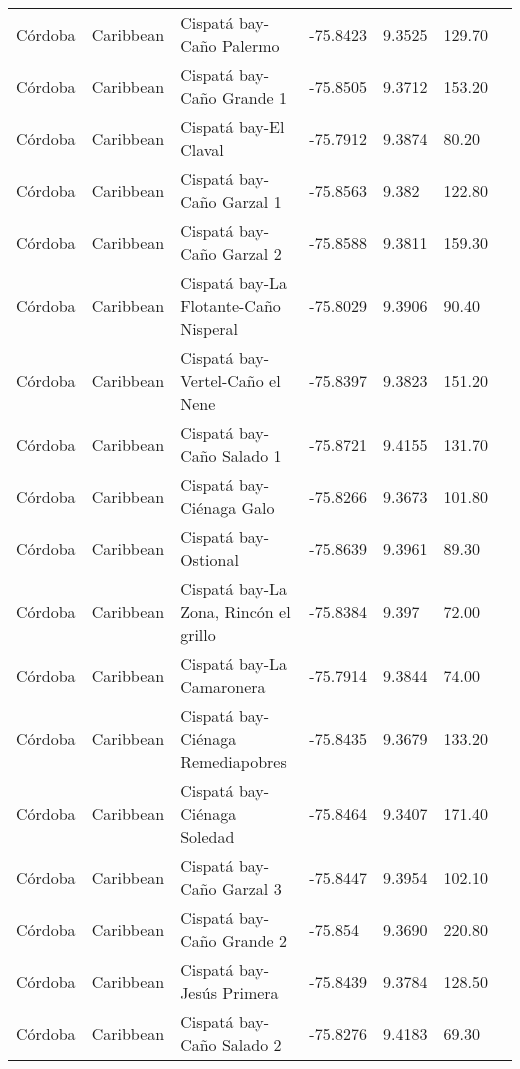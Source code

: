 \documentclass[review, authoryear]{elsarticle}   	%
\begin{document}
\begin{table}[htbp]
\begin{tabular}{p{2.0cm}p{2.0cm}p{4.0cm}p{1.0cm}p{1.0cm}p{2.0cm}p{2.5cm}}
C\'{o}rdoba&Caribbean&Cispat\'{a} bay-Ca\~{n}o Palermo&-75.8423&9.3525&129.70&\citet{Bolivar_inpreparation}\\ 
C\'{o}rdoba&Caribbean&Cispat\'{a} bay-Ca\~{n}o Grande 1&-75.8505&9.3712&153.20&\citet{Bolivar_inpreparation}\\ 
C\'{o}rdoba&Caribbean&Cispat\'{a} bay-El Claval&-75.7912&9.3874&80.20&\citet{Bolivar_inpreparation}\\ 
C\'{o}rdoba&Caribbean&Cispat\'{a} bay-Ca\~{n}o  Garzal 1&-75.8563&9.382&122.80&\citet{Bolivar_inpreparation}\\ 
C\'{o}rdoba&Caribbean&Cispat\'{a} bay-Ca\~{n}o  Garzal 2&-75.8588&9.3811&159.30&\citet{Bolivar_inpreparation}\\ 
C\'{o}rdoba&Caribbean&Cispat\'{a} bay-La Flotante-Ca\~{n}o Nisperal&-75.8029&9.3906&90.40&\citet{Bolivar_inpreparation}\\ 
C\'{o}rdoba&Caribbean&Cispat\'{a} bay-Vertel-Ca\~{n}o el Nene&-75.8397&9.3823&151.20&\citet{Bolivar_inpreparation}\\ 
C\'{o}rdoba&Caribbean&Cispat\'{a} bay-Ca\~{n}o Salado 1&-75.8721&9.4155&131.70&\citet{Bolivar_inpreparation}\\ 
C\'{o}rdoba&Caribbean&Cispat\'{a} bay-Ci\'{e}naga Galo&-75.8266&9.3673&101.80&\citet{Bolivar_inpreparation}\\ 
C\'{o}rdoba&Caribbean&Cispat\'{a} bay-Ostional&-75.8639&9.3961&89.30&\citet{Bolivar_inpreparation}\\ 
C\'{o}rdoba&Caribbean&Cispat\'{a} bay-La Zona, Rinc\'{o}n el grillo&-75.8384&9.397&72.00&\citet{Bolivar_inpreparation}\\ 
C\'{o}rdoba&Caribbean&Cispat\'{a} bay-La Camaronera&-75.7914&9.3844&74.00&\citet{Bolivar_inpreparation}\\ 
C\'{o}rdoba&Caribbean&Cispat\'{a} bay-Ci\'{e}naga Remediapobres&-75.8435&9.3679&133.20&\citet{Bolivar_inpreparation}\\ 
C\'{o}rdoba&Caribbean&Cispat\'{a}  bay-Ci\'{e}naga Soledad&-75.8464&9.3407&171.40&\citet{Bolivar_inpreparation}\\ 
C\'{o}rdoba&Caribbean&Cispat\'{a} bay-Ca\~{n}o Garzal 3&-75.8447&9.3954&102.10&\citet{Bolivar_inpreparation}\\ 
C\'{o}rdoba&Caribbean&Cispat\'{a} bay-Ca\~{n}o Grande 2&-75.854&9.3690&220.80&\citet{Bolivar_inpreparation}\\ 
C\'{o}rdoba&Caribbean&Cispat\'{a} bay-Jes\'{u}s Primera&-75.8439&9.3784&128.50&\citet{Bolivar_inpreparation}\\ 
C\'{o}rdoba&Caribbean&Cispat\'{a} bay-Ca\~{n}o Salado 2&-75.8276&9.4183&69.30&\citet{Bolivar_inpreparation}\\ 

\end{tabular}
\end{table}
\end{document}

